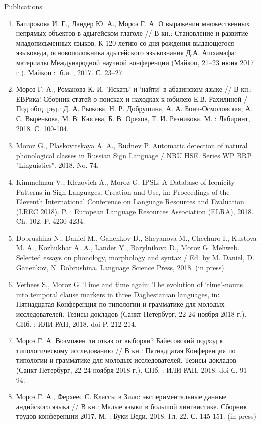 \documentclass{resume} %
\begin{document}
\begin{rSection}{Publications}
\begin{enumerate}
\item Багирокова И. Г., Ландер Ю. А., Мороз Г. А. О выражении множественных непрямых объектов в адыгейском глаголе // В кн.: Становление и развитие младописьменных языков. К 120-летию со дня рождения выдающегося языковеда, основоположника адыгейского языкознания Д.А. Ашхамафа: материалы Международной научной конференции (Майкоп, 21--23 июня 2017 г.). Майкоп : [б.и.], 2017. С. 23--27.
\item  Мороз Г. А., Романова К. И. 'Искать' и 'найти' в абазинском языке // В кн.: ЕВРика! Сборник статей о поисках и находках к юбилею Е.В. Рахилиной / Под общ. ред.: Д. А. Рыжова, Н. Р. Добрушина, А. А. Бонч-Осмоловская, А. С. Выренкова, М. В. Кюсева, Б. В. Орехов, Т. И. Резникова. М. : Лабиринт, 2018. С. 100-104.
\item Moroz G., Plaskovitskaya A. A., Rudnev P. Automatic detection of natural phonological classes in Russian Sign Language / NRU HSE. Series WP BRP "Linguistics". 2018. No. 74.
\item Kimmelman V., Klezovich A., Moroz G. IPSL: A Database of Iconicity Patterns in Sign Languages. Creation and Use, in: Proceedings of the Eleventh International Conference on Language Resources and Evaluation (LREC 2018). P. : European Language Resources Association (ELRA), 2018. Ch. 102. P. 4230-4234.
\item Dobrushina N., Daniel M., Ganenkov D., Sheyanova M., Chechuro I., Kustova M. A., Kozhukhar A. A., Lander Y., Barylnikova D., Moroz G. Mehweb. Selected essays on phonology, morphology and syntax / Ed. by M. Daniel, D. Ganenkov, N. Dobrushina. Language Science Press, 2018. (in press)
\item Verhees S., Moroz G. Time and time again: The evolution of ‘time’-nouns into temporal clause markers in three Daghestanian languages, in: Пятнадцатая Конференция по типологии и грамматике для молодых исследователей. Тезисы докладов (Санкт-Петербург, 22-24 ноября 2018 г.). СПб. : ИЛИ РАН, 2018. doi P. 212-214.
\item Мороз Г. А. Возможен ли отказ от выборки? Байесовский подход к типологическому исследованию // В кн.: Пятнадцатая Конференция по типологии и грамматике для молодых исследователей. Тезисы докладов (Санкт-Петербург, 22-24 ноября 2018 г.). СПб. : ИЛИ РАН, 2018. doi С. 91-94.
\item Мороз Г. А., Ферхеес С. Классы в Зило: экспериментальные данные андийского языка // В кн.: Малые языки в большой лингвистике. Сборник трудов конференции 2017. М. : Буки Веди, 2018. Гл. 22. С. 145-151. (in press)

\end{enumerate}
\end{rSection}
\end{document}
